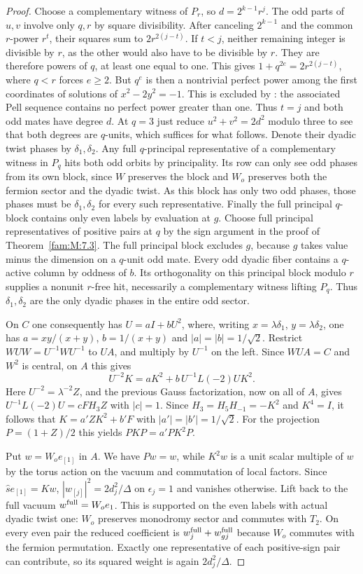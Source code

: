 \documentclass[11pt,a4paper]{article}
\numberwithin{equation}{section}
\theoremstyle{remark}
\begin{document}
\begin{proof}
Choose a complementary witness of $P_r$, so $d=2^{k-1}r^j$.
The odd parts of $u,v$ involve only $q,r$ by square divisibility.
After canceling $2^{k-1}$ and the common $r$-power $r^t$, their
squares sum to $2r^{2(j-t)}$. If $t<j$, neither remaining integer is
divisible by $r$, as the other would also have to be divisible by
$r$. They are therefore powers of $q$, at least one equal to one.
This gives $1+q^{2e}=2r^{2(j-t)}$, where $q<r$ forces $e\ge2$.
But $q^e$ is then a nontrivial perfect power among the first
coordinates of solutions of $x^2-2y^2=-1$. This is excluded by
\cite[Theorem~6.1]{FamCohn}: the associated Pell sequence contains no perfect power greater than one. Thus $t=j$ and both odd mates have degree $d$.
At $q=3$ just reduce $u^2+v^2=2d^2$ modulo three to see that
both degrees are $q$-units, which suffices for what follows. Denote their dyadic twist phases by
$\delta_1,\delta_2$. Any full $q$-principal representative of a
complementary witness in $P_q$ hits both odd orbits by principality.
Its row can only see odd phases from its own block, since $W$ preserves
the block and $W_o$ preserves both the fermion sector and the dyadic
twist. As this block has only two odd phases, those phases must be
$\delta_1,\delta_2$ for every such representative. Finally the full
principal $q$-block contains only even labels by evaluation at $g$.
Choose full principal representatives of positive pairs at $q$
by the sign argument in the proof of Theorem~\ref{fam:M:7.3}.
The full principal block excludes $g$, because $g$ takes value minus the dimension on a
$q$-unit odd mate. Every odd dyadic fiber contains a $q$-active
column by oddness of $b$. Its orthogonality on this principal block
modulo $r$ supplies a nonunit $r$-free hit, necessarily a complementary
witness lifting $P_q$. Thus $\delta_1,\delta_2$ are the only dyadic
phases in the entire odd sector.

On $C$ one consequently has $U=aI+bU^2$, where, writing
$x=\lambda\delta_1$, $y=\lambda\delta_2$, one has
$a=xy/(x+y)$, $b=1/(x+y)$ and $|a|=|b|=1/\sqrt2$.
Restrict $WUW=U^{-1}WU^{-1}$ to $U A$, and multiply by $U^{-1}$
on the left. Since $WU A=C$ and $W^2$ is central, on $A$ this gives
\[
 U^{-2}K
   =aK^2+b\,U^{-1}L(-2)U K^2.
\]
Here $U^{-2}=\lambda^{-2}Z$, and the previous Gauss factorization,
now on all of $A$, gives $U^{-1}L(-2)U=cF H_3 Z$ with $|c|=1$.
Since $H_3=H_5 H_{-1}=-K^2$ and $K^4=I$, it follows that
$K=a'ZK^2+b'F$ with $|a'|=|b'|=1/\sqrt2$.
For the projection $P=(1+Z)/2$ this yields $PKP=a'P K^2 P$.

Put $w=W_o e_{[1]}$ in $A$. We have $Pw=w$, while $K^2w$ is
a unit scalar multiple of $w$ by the torus action on the vacuum
and commutation of local factors. Since $\widehat s e_{[1]}=Kw$,
$|w_{[j]}|^2=2d_j^2/\Delta$ on $\epsilon_j=1$ and vanishes
otherwise. Lift back to the full vacuum $w^{\rm full}=W_o e_1$.
This is supported on the even labels with actual dyadic twist one:
$W_o$ preserves monodromy sector and commutes with $T_2$.
On every even pair the reduced coefficient is
$w^{\rm full}_j+w^{\rm full}_{gj}$ because $W_o$ commutes with the
fermion permutation. Exactly one representative of each positive-sign
pair can contribute, so its squared weight is again $2d_j^2/\Delta$.


\end{proof}
\end{document}
